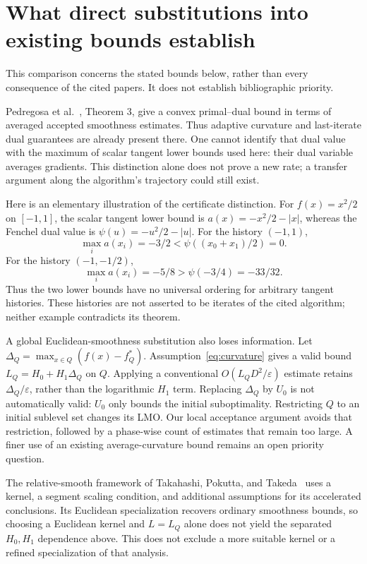 \section{What direct substitutions into existing bounds establish}
\label{sec:prioranalysis}
This comparison concerns the stated bounds below, rather than every
consequence of the cited papers. It does not establish bibliographic priority.

Pedregosa et al.~\cite{pedregosa}, Theorem 3, give a convex primal--dual
bound in terms of averaged accepted smoothness estimates. Thus adaptive
curvature and last-iterate dual guarantees are already present there.
One cannot identify that dual value with the maximum of scalar tangent
lower bounds used here: their dual variable averages gradients. This
distinction alone does not prove a new rate; a transfer argument along
the algorithm's trajectory could still exist.

Here is an elementary illustration of the certificate distinction. For
$f(x)=x^2/2$ on $[-1,1]$, the scalar tangent lower bound is
$a(x)=-x^2/2-|x|$, whereas the Fenchel dual value is
$\psi(u)=-u^2/2-|u|$. For the history $(-1,1)$,
\[
 \max_i a(x_i)=-3/2 < \psi((x_0+x_1)/2)=0.
\]
For the history $(-1,-1/2)$,
\[
 \max_i a(x_i)=-5/8 > \psi(-3/4)=-33/32.
\]
Thus the two lower bounds have no universal ordering for arbitrary
tangent histories. These histories are not asserted to be iterates of
the cited algorithm; neither example contradicts its theorem.

A global Euclidean-smoothness substitution also loses information.
Let $\Delta_Q=\max_{x\in Q}(f(x)-f_Q^*)$. Assumption~\eqref{eq:curvature}
gives a valid bound $L_Q=H_0+H_1\Delta_Q$ on $Q$. Applying a conventional
$O(L_QD^2/\varepsilon)$ estimate retains $\Delta_Q/\varepsilon$, rather
than the logarithmic $H_1$ term. Replacing $\Delta_Q$ by $U_0$ is not
automatically valid: $U_0$ only bounds the initial suboptimality.
Restricting $Q$ to an initial sublevel set changes its LMO. Our local
acceptance argument avoids that restriction, followed by a phase-wise
count of estimates that remain too large. A finer use of an existing
average-curvature bound remains an open priority question.

The relative-smooth framework of Takahashi, Pokutta, and
Takeda~\cite{bregmanfw} uses a kernel, a segment scaling condition, and
additional assumptions for its accelerated conclusions. Its Euclidean
specialization recovers ordinary smoothness bounds, so choosing a
Euclidean kernel and $L=L_Q$ alone does not yield the separated
$H_0,H_1$ dependence above. This does not exclude a more suitable
kernel or a refined specialization of that analysis.

